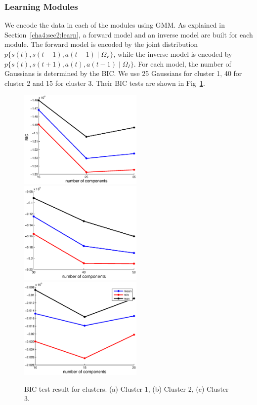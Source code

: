 \subsubsection{Learning Modules}
\label{cha4:sec3:learning:module}
We encode the data in each of the modules using GMM. As explained in Section~\ref{cha4:sec2:learn}, a forward model and an inverse model are built for each module. The forward model is encoded by the joint distribution $p\{s(t),s(t-1),a(t-1)\mid\Omega_F\}$, while the inverse model is encoded by $p\{s(t),s(t+1),a(t),a(t-1)\mid\Omega_I\}$. For each model, the number of Gaussians is determined by the BIC. We use 25 Gaussians for cluster 1, 40 for cluster 2 and 15 for cluster 3. Their BIC tests are shown in Fig~\ref{fig:bic}.

\begin{figure}
  \centering
  \includegraphics[width=6cm]{./fig_cha4/bic_cluster1.eps}
  \includegraphics[width=6cm]{./fig_cha4/bic_cluster2.eps}
  \includegraphics[width=6cm]{./fig_cha4/bic_cluster3.eps}
  \caption{ \scriptsize{BIC test result for clusters. (a) Cluster 1, (b) Cluster 2, (c) Cluster 3.}
}

\label{fig:bic}
\end{figure}

